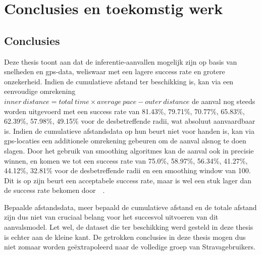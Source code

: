 \chapter{Conclusies en toekomstig werk}
\section{Conclusies}
Deze thesis toont aan dat de inferentie-aanvallen mogelijk zijn op basis van
snelheden en \ac{gps}-data, weliswaar met een lagere success rate en grotere
onzekerheid. Indien de cumulatieve afstand ter beschikking is, kan via een
eenvoudige omrekening $inner\ distance = total\ time \times average\ pace -
    outer\ distance$ de aanval nog steeds worden uitgevoerd met een success rate
van 81.43\%, 79.71\%, 70.77\%, 65.83\%, 62.39\%, 57.98\%, 49.15\% voor de
desbetreffende radii, wat absoluut aanvaardbaar is. Indien de cumulatieve
afstandsdata op hun beurt niet voor handen is, kan via \ac{gps}-locaties een
additionele omrekening gebeuren om de aanval alsnog te doen slagen. Door het
gebruik van smoothing algoritmes kan de aanval ook in precisie winnen, en komen
we tot een success rate van 75.0\%, 58.97\%, 56.34\%, 41.27\%, 44.12\%, 32.81\%
voor de desbetreffende radii en een smoothing window van 100. Dit is op zijn
beurt een acceptabele success rate, maar is wel een stuk lager dan de success
rate bekomen door~\citeauthor{Dhondt}~\cite{Dhondt}.

Bepaalde afstandsdata, meer bepaald de cumulatieve afstand en de totale afstand
zijn dus niet van cruciaal belang voor het succesvol uitvoeren van dit
aanvalsmodel. Let wel, de dataset die ter beschikking werd gesteld in deze
thesis is echter aan de kleine kant. De getrokken conclusies in deze thesis
mogen dus niet zomaar worden geëxtrapoleerd naar de volledige groep van
Stravagebruikers.

